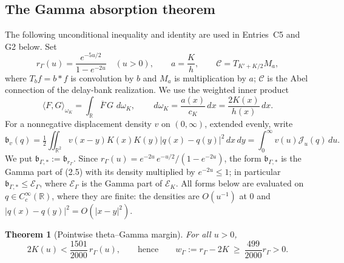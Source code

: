 \documentclass[11pt]{amsart}
\newtheorem{theorem}{Theorem}[section]
\theoremstyle{definition}
\theoremstyle{remark}
\newcommand{\R}{\mathbb R}
\newcommand{\dd}{\,d}
\newcommand{\EK}{\mathscr E_K}
\begin{document}
\subsection{The Gamma absorption theorem}
\label{subsec:absorption}

The following unconditional inequality and identity are used in
Entries~C5 and G2 below.  Set
\[
 r_\Gamma(u)=\frac{e^{-5u/2}}{1-e^{-2u}}\quad(u>0),
 \qquad
 a=\frac Kh,
 \qquad
 \mathcal C=T_{K'+K/2}M_a ,
\tag{3.1}
\]
where \(T_bf=b*f\) is convolution by \(b\) and \(M_a\) is multiplication
by \(a\); \(\mathcal C\) is the Abel connection of the delay-bank
realization.  We use the weighted inner product
\[
 \langle F,G\rangle_{\omega_K}=\int_\R\overline{F}\,G\,\dd\omega_K,
 \qquad
 \dd\omega_K=\frac{a(x)}{c_K}\dd x=\frac{2K(x)}{h(x)}\dd x .
\]
For a nonnegative displacement density \(v\) on \((0,\infty)\), extended
evenly, write
\[
 \mathfrak b_v(q)=\tfrac12\iint_{\R^2}v(x-y)K(x)K(y)|q(x)-q(y)|^2\dd x\dd y
 =\int_0^\infty v(u)\mathcal J_u(q)\dd u .
\tag{3.2}
\]
We put \(\mathfrak b_{\Gamma,*}:=\mathfrak b_{r_\Gamma}\).  Since
\(r_\Gamma(u)=e^{-2u}\,e^{-u/2}/(1-e^{-2u})\), the form
\(\mathfrak b_{\Gamma,*}\) is the Gamma part of (2.5) with its density
multiplied by \(e^{-2u}\le1\); in particular
\(\mathfrak b_{\Gamma,*}\le\mathscr E_\Gamma\), where
\(\mathscr E_\Gamma\) is the Gamma part of \(\EK\).  All forms below are
evaluated on \(q\in C_c^\infty(\R)\), where they are finite: the densities
are \(O(u^{-1})\) at \(0\) and \(|q(x)-q(y)|^2=O(|x-y|^2)\).

\begin{theorem}[Pointwise theta--Gamma margin]
\label{thm:margin}
For all \(u>0\),
\[
 \boxed{2K(u)<\frac{1501}{2000}\,r_\Gamma(u)},
 \qquad\text{hence}\qquad
 w_\Gamma:=r_\Gamma-2K\ \ge\ \frac{499}{2000}r_\Gamma>0 .
\tag{3.3}
\]
\end{theorem}
\end{document}
